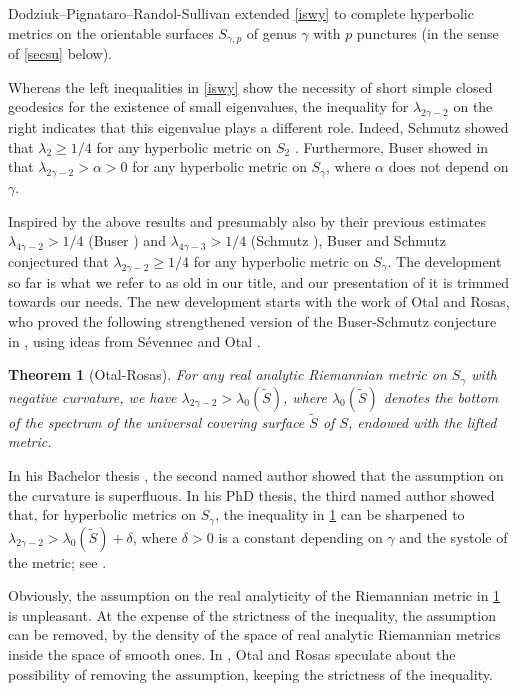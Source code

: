 \documentclass[a4paper,11pt]{amsart}
\numberwithin{equation}{section}
\newtheorem{thm}[equation]{Theorem}
\theoremstyle{definition}
\begin{document}
Dodziuk--Pignataro--Randol-Sullivan \cite[1987]{DPRS} extended \cref{iswy} to complete hyperbolic metrics on the orientable surfaces $S_{\gamma,p}$ of genus $\gamma$ with $p$ punctures (in the sense of \cref{secsu} below).

Whereas the left inequalities in \cref{iswy} show the necessity of short simple closed geodesics for the existence of small eigenvalues,
the inequality for $\lambda_{2\gamma-2}$ on the right indicates that this eigenvalue plays a different role.
Indeed, Schmutz showed that $\lambda_2\ge1/4$ for any hyperbolic metric on $S_2$ \cite[1991]{S2}.
Furthermore, Buser showed in \cite[1992]{Bu2} that $\lambda_{2\gamma-2}>\alpha>0$ for any hyperbolic metric on $S_\gamma$, where $\alpha$ does not depend on $\gamma$.

Inspired by the above results and presumably also by their previous estimates $\lambda_{4\gamma-2}>1/4$ (Buser \cite[1977]{Bu1}) and $\lambda_{4\gamma-3}>1/4$ (Schmutz \cite[1990]{S1}),
Buser and Schmutz conjectured that $\lambda_{2\gamma-2}\ge1/4$ for any hyperbolic metric on $S_\gamma$.
The development so far is what we refer to as old in our title,
and our presentation of it is trimmed towards our needs.
The new development starts with the work of Otal and Rosas, who proved the following strengthened version of the Buser-Schmutz conjecture in \cite[2009]{OR},
using ideas from S\'evennec \cite[2002]{Se} and Otal \cite[2008]{Ot}.

\begin{thm}[Otal-Rosas]\label{ior}
For any real analytic Riemannian metric on $S_\gamma$ with negative curvature, we have $\lambda_{2\gamma-2}>\lambda_0(\tilde S)$, where $\lambda_0(\tilde S)$ denotes the bottom of the spectrum of the universal covering surface $\tilde S$ of $S$, endowed with the lifted metric. 
\end{thm}

In his Bachelor thesis \cite[2013]{Mat}, the second named author showed that the assumption on the curvature is superfluous.
In his PhD thesis, the third named author showed that, for hyperbolic metrics on $S_\gamma$, the inequality in \cref{ior} can be sharpened to $\lambda_{2\gamma-2}>\lambda_0(\tilde S)+\delta$, where $\delta>0$ is a constant depending on $\gamma$ and the systole of the metric; see  \cite[2014]{Mo}.

Obviously, the assumption on the real analyticity of the Riemannian metric in \cref{ior} is unpleasant.
At the expense of the strictness of the  inequality, the assumption can be removed, by the density of the space of real analytic Riemannian metrics inside the space of smooth ones.
In \cite[Question 2]{OR}, Otal and Rosas speculate about the possibility of removing the assumption, keeping the strictness of the inequality.
\end{document}
